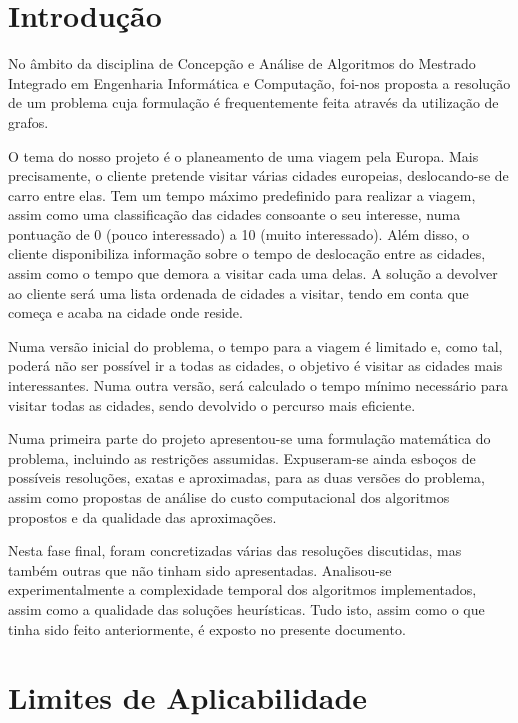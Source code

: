 \documentclass[12pt,a4paper,reqno]{report}
\numberwithin{equation}{section}
\begin{document}


\tableofcontents


\chapter{Introdução}

No âmbito da disciplina de Concepção e Análise de Algoritmos do Mestrado Integrado em Engenharia Informática e Computação, foi-nos proposta a resolução de um problema cuja formulação é frequentemente feita através da utilização de grafos.

O tema do nosso projeto é o planeamento de uma viagem pela Europa. Mais precisamente, o cliente pretende visitar várias cidades europeias, deslocando-se de carro entre elas. Tem um tempo máximo predefinido para realizar a viagem, assim como uma classificação das cidades consoante o seu interesse, numa pontuação de 0 (pouco interessado) a 10 (muito interessado). Além disso, o cliente disponibiliza informação sobre o tempo de deslocação entre as cidades, assim como o tempo que demora a visitar cada uma delas. A solução a devolver ao cliente será uma lista ordenada de cidades a visitar, tendo em conta que começa e acaba na cidade onde reside.

Numa versão inicial do problema, o tempo para a viagem é limitado e, como tal, poderá não ser possível ir a todas as cidades, o objetivo é visitar as cidades mais interessantes. Numa outra versão, será calculado o tempo mínimo necessário para visitar todas as cidades, sendo devolvido o percurso mais eficiente.

Numa primeira parte do projeto apresentou-se uma formulação matemática do problema, incluindo as restrições assumidas. Expuseram-se ainda esboços de possíveis resoluções, exatas e aproximadas, para as duas versões do problema, assim como propostas de análise do custo computacional dos algoritmos propostos e da qualidade das aproximações.

Nesta fase final, foram concretizadas várias das resoluções discutidas, mas também outras que não tinham sido apresentadas. Analisou-se experimentalmente a complexidade temporal dos algoritmos implementados, assim como a qualidade das soluções heurísticas. Tudo isto, assim como o que tinha sido feito anteriormente, é exposto no presente documento.

\chapter{Limites de Aplicabilidade}
\end{document}
